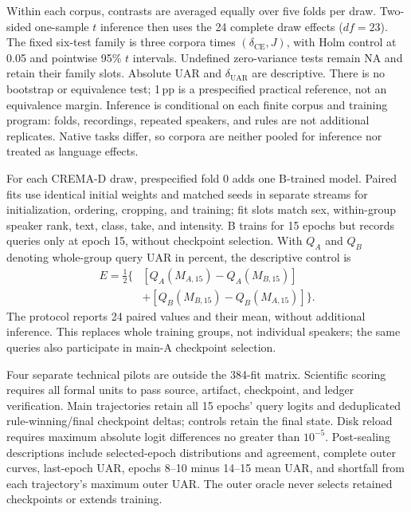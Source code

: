 Within each corpus, contrasts are averaged equally over five folds per
draw. Two-sided one-sample $t$ inference then uses the 24 complete draw
effects ($df=23$). The fixed six-test family is three corpora times
$(\delta_{\mathrm{CE}},J)$, with Holm control at 0.05 and pointwise 95\%
$t$ intervals. Undefined zero-variance tests remain NA and retain their
family slots. Absolute UAR and $\delta_{\mathrm{UAR}}$ are descriptive.
There is no bootstrap or equivalence test; 1\,pp is a prespecified
practical reference, not an equivalence margin. Inference is conditional
on each finite corpus and training program: folds, recordings, repeated
speakers, and rules are not additional replicates. Native tasks differ,
so corpora are neither pooled for inference nor treated as language effects.

For each CREMA-D draw, prespecified fold 0 adds one B-trained model.
Paired fits use identical initial weights and matched seeds in separate
streams for initialization, ordering, cropping, and training; fit slots match sex, within-group speaker
rank, text, class, take, and intensity. B trains for 15 epochs but records
queries only at epoch 15, without checkpoint selection. With $Q_A$ and
$Q_B$ denoting whole-group query UAR in percent, the descriptive control is
\begin{equation}
\begin{aligned}
E=\tfrac12\{&[Q_A(M_{A,15})-Q_A(M_{B,15})]\\
&+[Q_B(M_{B,15})-Q_B(M_{A,15})]\}.
\end{aligned}
\end{equation}
The protocol reports 24 paired values and their mean, without additional
inference. This replaces whole training groups, not individual speakers;
the same queries also participate in main-A checkpoint selection.

Four separate technical pilots are outside the 384-fit matrix. Scientific
scoring requires all formal units to pass source, artifact, checkpoint,
and ledger verification. Main trajectories retain all 15 epochs' query
logits and deduplicated rule-winning/final checkpoint deltas; controls
retain the final state. Disk reload requires maximum absolute logit
differences no greater than $10^{-5}$.
Post-sealing descriptions include selected-epoch distributions and
agreement, complete outer curves, last-epoch UAR, epochs 8--10 minus
14--15 mean UAR, and shortfall from each trajectory's maximum outer UAR.
The outer oracle never selects retained checkpoints or extends training.
